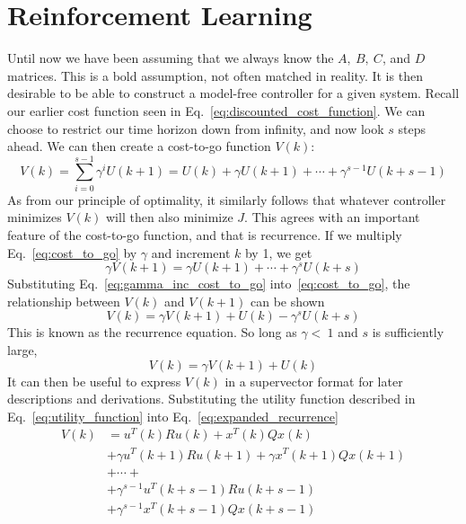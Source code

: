 \FloatBarrier\section{Reinforcement Learning} %
Until now we have been assuming that we always know the $A,\ B,\ C$, and $D$ matrices. This is a bold assumption, not often matched in reality. It is then desirable to be able to construct a model-free controller for a given system.
Recall our earlier cost function seen in Eq.~\ref{eq:discounted_cost_function}. We can choose to restrict our time horizon down from infinity, and now look $s$ steps ahead. We can then create a cost-to-go function $V(k)$:
\begin{equation}
    V\left(k\right)=\sum_{i=0}^{s-1}{\gamma^i U\left(k+1\right)=U\left(k\right)+\gamma U\left(k+1\right)+\cdots+\gamma^{s-1}U\left(k+s-1\right)}
    \label{eq:cost_to_go}
\end{equation}
As from our principle of optimality, it similarly follows that whatever controller minimizes $V\left(k\right)$ will then also minimize $J$. This agrees with an important feature of the cost-to-go function, and that is recurrence. If we multiply Eq.~\ref{eq:cost_to_go} by $\gamma$ and increment $k$ by 1, we get
\begin{equation}
    \gamma V\left(k+1\right)=\gamma U\left(k+1\right)+\cdots+\gamma^s U\left(k+s\right)
    \label{eq:gamma_inc_cost_to_go}
\end{equation}
Substituting Eq.~\ref{eq:gamma_inc_cost_to_go} into~\ref{eq:cost_to_go}, the relationship between $V\left(k\right)$ and $V\left(k+1\right)$ can be shown
\begin{equation}
    V\left(k\right)=\gamma V\left(k+1\right)+U\left(k\right)-\gamma^s U\left(k+s\right)
    \label{eq:expanded_recurrence}
\end{equation}
This is known as the recurrence equation. So long as $\gamma<\ 1$ and $s$ is sufficiently large,
\begin{equation}
    V\left(k\right)=\gamma V\left(k+1\right)+U\left(k\right)
    \label{eq:recurrence}
\end{equation}
It can then be useful to express $V\left(k\right)$ in a supervector format for later descriptions and derivations. Substituting the utility function described in Eq.~\ref{eq:utility_function} into Eq.~\ref{eq:expanded_recurrence}
\begin{equation}
    \begin{split}
        V\left(k\right)&=u^T\left(k\right)Ru\left(k\right)+x^T\left(k\right)Qx\left(k\right) \\
        &+\gamma u^T\left(k+1\right)Ru\left(k+1\right)+\gamma x^T\left(k+1\right)Qx\left(k+1\right) \\
        & + \cdots + \\
        &+\gamma^{s-1}u^T\left(k+s-1\right)Ru\left(k+s-1\right) \\
        &+\gamma^{s-1}x^T\left(k+s-1\right)Qx\left(k+s-1\right)
    \end{split}
    \label{eq:supervector_expanded_ctg}
\end{equation}
